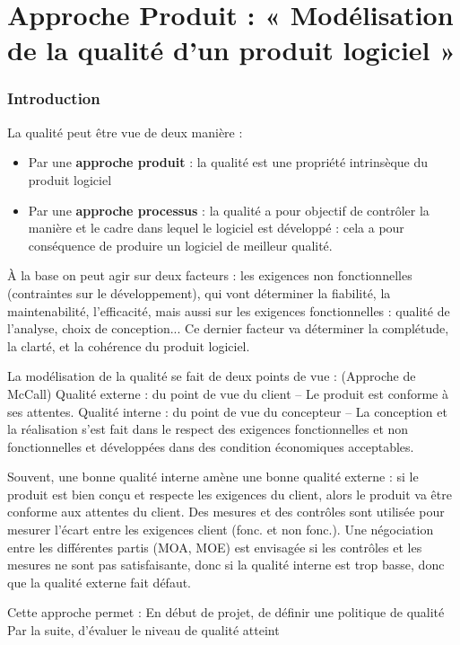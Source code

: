\part{Approche Produit : « Modélisation de la qualité d’un produit logiciel »}

\section{Introduction}

La qualité peut être vue de deux manière :
\begin{itemize}
\item Par une \textbf{approche produit} : la qualité est une propriété intrinsèque du produit logiciel
\item Par une \textbf{approche processus} : la qualité a pour objectif de contrôler la manière et le cadre 	dans lequel le logiciel est développé : cela a pour conséquence de produire un logiciel de meilleur qualité.
\end{itemize}

À la base on peut agir sur deux facteurs : les exigences non fonctionnelles (contraintes sur le développement), qui vont déterminer la fiabilité, la maintenabilité, l'efficacité, mais aussi sur les exigences fonctionnelles : qualité de l'analyse, choix de conception... Ce dernier facteur va déterminer la complétude, la clarté, et la cohérence du produit logiciel.

La modélisation de la qualité se fait de deux points de vue : (Approche de McCall)
Qualité externe : du point de vue du client – Le produit est conforme à ses attentes.
Qualité interne : du point  de vue du concepteur – La conception et la réalisation s'est fait dans le respect des exigences fonctionnelles et non fonctionnelles et développées dans des condition économiques acceptables.

Souvent, une bonne qualité interne amène une bonne qualité externe : si le produit est bien conçu et respecte les exigences du client, alors le produit va être conforme aux attentes du client. Des mesures et des contrôles sont utilisée pour mesurer l'écart entre les exigences client (fonc. et non fonc.). Une négociation entre les différentes partis (MOA, MOE) est envisagée si les contrôles et les mesures ne sont pas satisfaisante, donc si la qualité interne est trop basse, donc que la qualité externe fait défaut.

Cette approche permet :
En début de projet, de définir 	une politique de qualité
Par la suite, d'évaluer le niveau de qualité atteint


